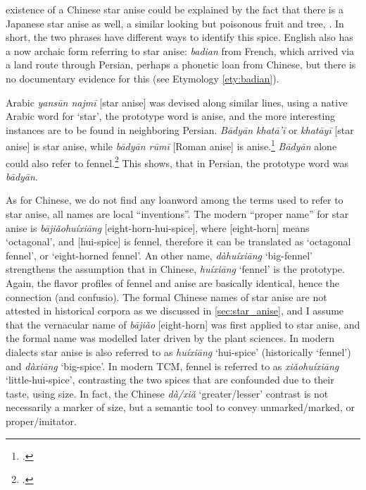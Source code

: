 existence of a Chinese star anise could be explained by the fact that there is a Japanese star anise as well, a similar looking but poisonous fruit and tree, . In short, the two phrases have different ways to identify this spice. English also has a now archaic form referring to star anise: \textit{badian} from French, which arrived via a land route through Persian, perhaps a phonetic loan from Chinese, but there is no documentary evidence for this (see Etymology \ref{ety:badian}).

Arabic \textit{yansūn najmī} [star anise] was devised along similar lines, using a native Arabic word for `star', the prototype word is anise, and the more interesting instances are to be found in neighboring Persian. \textit{Bādyān khatā'ī} or \textit{khatāyī} [star anise] is star anise, while \textit{bādyān rūmī} [Roman anise] is anise.\footcite[Vol. 1, p. 197]{hayyim_new_1934} \textit{Bādyān} alone could also refer to fennel.\footcite[140]{steingass_comprehensive_1892} This shows, that in Persian, the prototype word was \textit{bādyān}. 

As for Chinese, we do not find any loanword among the terms used to refer to star anise, all names are local ``inventions''. The modern ``proper name'' for star anise is \textit{bājiǎohuíxiāng} [eight-horn-hui-spice], where [eight-horn] means `octagonal', and [hui-spice] is fennel, therefore it can be translated as `octagonal fennel', or `eight-horned fennel'. An other name, \textit{dàhuíxiāng} `big-fennel' strengthens the assumption that in Chinese, \textit{huíxiāng} `fennel' is the prototype. Again, the flavor profiles of fennel and anise are basically identical, hence the connection (and confusio). The formal Chinese names of star anise are not attested in historical corpora as we discussed in \cref{sec:star_anise}, and I assume that the vernacular name of \textit{bājiǎo} [eight-horn] was first applied to star anise, and the formal name was modelled later driven by the plant sciences. In modern dialects star anise is also referred to as \textit{huíxiāng} `hui-spice' (historically `fennel') and \textit{dàxiāng} `big-spice'. In modern \gls{TCM}, fennel is referred to as \textit{xiǎohuíxiāng} `little-hui-spice', contrasting the two spices that are confounded due to their taste, using size. In fact, the Chinese  \textit{dà/xiǎ} `greater/lesser' contrast is not necessarily a marker of size, but a semantic tool to convey unmarked/marked, or proper/imitator.


